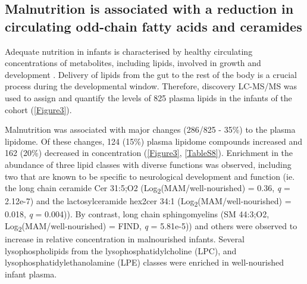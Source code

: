 \documentclass{article}
\begin{document}
\subsection*{Malnutrition is associated with a reduction in circulating odd-chain fatty acids and ceramides}
Adequate nutrition in infants is characterised by healthy circulating concentrations of metabolites, including lipids, involved in growth and development \cite{badaloo2006lipid}.
Delivery of lipids from the gut to the rest of the body is a crucial process during the developmental window.
Therefore, discovery LC-MS/MS was used to assign and quantify the levels of 825 plasma lipids in the infants of the cohort (\autoref{Figure3}).

Malnutrition was associated with major changes (286/825 - 35\%) to the plasma lipidome.
Of these changes, 124 (15\%) plasma lipidome compounds increased and 162 (20\%) decreased in concentration (\autoref{Figure3}, \autoref{TableS8}).
Enrichment in the abundance of three lipid classes with diverse functions was observed, including two that are known to be specific to neurological development and function (ie. the long chain ceramide Cer 31:5;O2 (Log\textsubscript{2}(\gls{MAM}/well-nourished) = 0.36, \textit{q} = 2.12e-7) and the lactosylceramide hex2cer 34:1 (Log\textsubscript{2}(\gls{MAM}/well-nourished) = 0.018, \textit{q} = 0.004)).
By contrast, long chain sphingomyelins (SM 44:3;O2, Log\textsubscript{2}(\gls{MAM}/well-nourished) = FIND, \textit{q} = 5.81e-5)) and others were observed to increase in relative concentration in malnourished infants.
Several lysophospholipids from the lysophosphatidylcholine (LPC), and lysophosphatidylethanolamine (LPE) classes were enriched in well-nourished infant plasma.
\end{document}
